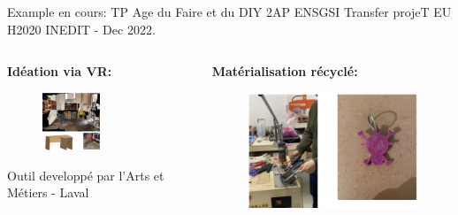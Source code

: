 \documentclass[
  11pt,
  ignorenonframetext,
  aspectratio=169,
  c]{beamer}
\begin{document}
\begin{frame}{Example en cours: TP Age du Faire et du DIY \hfill 2AP
ENSGSI}
\protect\hypertarget{example-en-cours-tp-age-du-faire-et-du-diy-2ap-ensgsi}{}
Transfer projeT EU H2020 INEDIT - Dec 2022.

\begin{columns}[T]
\begin{column}{0.6\textwidth}
\textbf{Idéation via VR:}

\begin{figure}

{\centering \includegraphics[width=0.5\textwidth,height=\textheight]{Figures/slides/Age-faire.jpg}

}

\end{figure}

\tiny Outil developpé par l'Arts et Métiers - Laval
\end{column}

\begin{column}{0.4\textwidth}
\textbf{Matérialisation récyclé:}

\begin{figure}

{\centering \includegraphics[width=1\textwidth,height=\textheight]{Figures/slides/Age-faire-1.png}

}

\end{figure}
\end{column}
\end{columns}
\end{frame}
\end{document}
